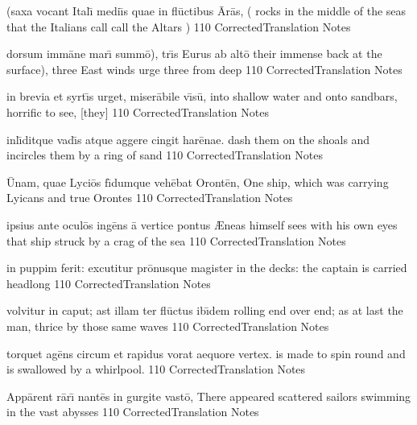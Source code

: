 \documentclass[]{book}
\begin{document}
	\latline
	  {(saxa vocant Ital\={\macron \i} medi\={\macron \i}s quae in fl\={\macron u}ctibus \={\macron A}r\={\macron a}s,}
	  { ( rocks in the middle of the seas that the Italians call call the Altars )   }
	  {110}
	  { CorrectedTranslation }
	  { Notes }


	\newpage

	\latline
	  {dorsum imm\={\macron a}ne mar\={\macron \i} summ\={\macron o}), tr\={\macron \i}s Eurus ab alt\={\macron o}}
	  { their immense back at the surface), three East winds urge three from deep }
	  {110}
	  { CorrectedTranslation }
	  { Notes }


	\latline
	  {in brevia et syrt\={\macron \i}s urget, miser\={\macron a}bile v\={\macron \i}s\={\macron u},}
	  { into shallow water and onto sandbars, horrific to see, [they] }
	  {110}
	  { CorrectedTranslation }
	  { Notes }


	\latline
	  {inl\={\macron \i}ditque vad\={\macron \i}s atque aggere cingit har\={\macron e}nae.}
	  { dash them on the shoals and incircles them by a ring of sand }
	  {110}
	  { CorrectedTranslation }
	  { Notes }


	\newpage

	\latline
	  {\={\macron U}nam, quae Lyci\={\macron o}s f\={\macron \i}dumque veh\={\macron e}bat Oront\={\macron e}n,}
	  { One ship, which was carrying Lyicans and true Orontes }
	  {110}
	  { CorrectedTranslation }
	  { Notes }


	\latline
	  {ipsius ante ocul\={\macron o}s ing\={\macron e}ns \={\macron a} vertice pontus}
	  { {\AE}neas himself sees with his own eyes that ship struck by a crag of the sea }
	  {110}
	  { CorrectedTranslation }
	  { Notes }


	\latline
	  {in puppim ferit:  excutitur pr\={\macron o}nusque magister}
	  { in the decks: the captain is carried headlong }
	  {110}
	  { CorrectedTranslation }
	  { Notes }


	\newpage

	\latline
	  {volvitur in caput; ast illam ter fl\={\macron u}ctus ib\={\macron \i}dem}
	  { rolling end over end; as at last the man, thrice by those same waves  }
	  {110}
	  { CorrectedTranslation }
	  { Notes }


	\latline
	  {torquet ag\={\macron e}ns circum et rapidus vorat aequore vertex.}
	  { is made to spin round and is swallowed by a whirlpool. }
	  {110}
	  { CorrectedTranslation }
	  { Notes }


	\latline
	  {App\={\macron a}rent r\={\macron a}r\={\macron \i} nant\={\macron e}s in gurgite vast\={\macron o},}
	  { There appeared scattered sailors swimming in the vast abysses }
	  {110}
	  { CorrectedTranslation }
	  { Notes }
\end{document}
